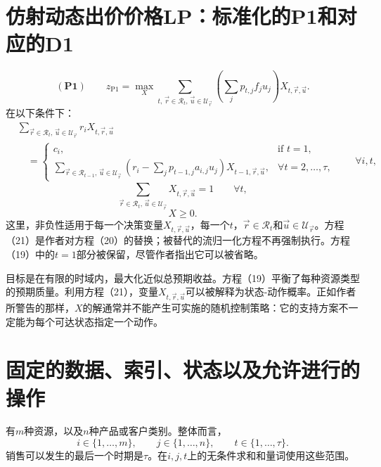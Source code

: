 \documentclass{article}
\begin{document}
\section*{仿射动态出价价格LP：标准化的P1和对应的D1}

\begin{equation}
(\mathbf{P1})\qquad
z_{\mathrm{P1}}=\max_X
\sum_{t,\,\vec r\in\mathscr R_t,\,\vec u\in\mathscr U_{\vec r}}
\left(\sum_j p_{t,j}f_j u_j\right)X_{t,\vec r,\vec u}.
\tag{18}
\end{equation}
在以下条件下：
\begin{equation}
\begin{split}
&\sum_{\vec r\in\mathscr R_t,\,\vec u\in\mathscr U_{\vec r}}
 r_iX_{t,\vec r,\vec u}\\
&\quad=
\begin{cases}
c_i, &\text{if }t=1,\\[2pt]
\displaystyle
\sum_{\vec r\in\mathscr R_{t-1},\,\vec u\in\mathscr U_{\vec r}}
\left(r_i-\sum_j p_{t-1,j}a_{i,j}u_j\right)
X_{t-1,\vec r,\vec u},
&\forall t=2,\ldots,\tau,
\end{cases}
\qquad\forall i,t,
\end{split}
\tag{19}
\end{equation}
\begin{equation}
\sum_{\vec r\in\mathscr R_t,\,\vec u\in\mathscr U_{\vec r}}
X_{t,\vec r,\vec u}=1
\qquad\forall t,
\tag{21}
\end{equation}
\[
X\geqslant0.
\]
这里，非负性适用于每一个决策变量\(X_{t,\vec r,\vec u}\)，每一个\(t\)，\(\vec r\in\mathscr R_t\)和\(\vec u\in\mathscr U_{\vec r}\)。方程（21）是作者对方程（20）的替换；被替代的流归一化方程不再强制执行。方程（19）中的\(t=1\)部分被保留，尽管作者指出它可以被省略。

目标是在有限的时域内，最大化近似总预期收益。方程（19）平衡了每种资源类型的预期质量。利用方程（21），变量\(X_{t,\vec r,\vec u}\)可以被解释为状态-动作概率。正如作者所警告的那样，\(X\)的解通常并不能产生可实施的随机控制策略：它的支持方案不一定能为每个可达状态指定一个动作。

\section*{固定的数据、索引、状态以及允许进行的操作}

有\(m\)种资源，以及\(n\)种产品或客户类别。整体而言，
\[
i\in\{1,\ldots,m\},\qquad
j\in\{1,\ldots,n\},\qquad
t\in\{1,\ldots,\tau\}.
\]
销售可以发生的最后一个时期是\(\tau\)。在\(i,j,t\)上的无条件求和和量词使用这些范围。
\end{document}

